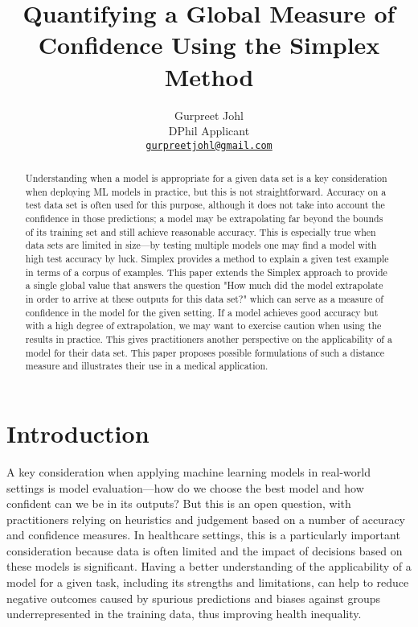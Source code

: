 \documentclass{article}
\title{Quantifying a Global Measure of Confidence Using the Simplex Method}
\author{%
  Gurpreet Johl \\
  DPhil Applicant \\
  \href{mailto:gurpreetjohl@gmail.com}{\texttt{gurpreetjohl@gmail.com}}
}
\begin{document}
\maketitle

\begin{abstract}
Understanding when a model is appropriate for a given data set is a key consideration when deploying ML models in practice, but this is not straightforward.
Accuracy on a test data set is often used for this purpose, although it does not take into account the confidence in those predictions; a model may be extrapolating far beyond the bounds of its training set and still achieve reasonable accuracy.
This is especially true when data sets are limited in size---by testing multiple models one may find a model with high test accuracy by luck.
Simplex provides a method to explain a given test example in terms of a corpus of examples. This paper extends the Simplex approach to provide a single global value that answers the question "How much did the model extrapolate in order to arrive at these outputs for this data set?"
which can serve as a measure of confidence in the model for the given setting.
If a model achieves good accuracy but with a high degree of extrapolation, we may want to exercise caution when using the results in practice.
This gives practitioners another perspective on the applicability of a model for their data set.
This paper proposes possible formulations of such a distance measure and illustrates their use in a medical application.
\end{abstract}



\section{Introduction}

A key consideration when applying machine learning models in real-world settings is model evaluation---how do we choose the best model and how confident can we be in its outputs? But this is an open question, with practitioners relying on heuristics and judgement based on a number of accuracy and confidence measures\cite{ding_model_2018}\cite{raschka_model_2020}.
In healthcare settings, this is a particularly important consideration because data is often limited and the impact of decisions based on these models is significant. Having a better understanding of the applicability of a model for a given task, including its strengths and limitations, can help to reduce negative outcomes caused by spurious predictions and biases against groups underrepresented in the training data, thus improving health inequality.
\end{document}
